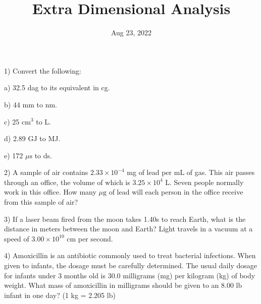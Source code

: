 \documentclass[12pt]{article}
\title{\textbf{Extra Dimensional Analysis}}
\date{Aug 23, 2022}
\newcommand{\brian}[1]{{\color{orange}{#1}}}
\begin{document}
\maketitle 

1) Convert the following:

a) 32.5 dag to its equivalent in cg.

\brian{325 cg}

b) 44 mm to nm.

\brian{$4.4\times 10^{7}$}

c) 25 cm$^3$ to L.

\brian{0.025 L}

d) 2.89 GJ to MJ.

\brian{2,890 MJ}

e) 172 $\mu\text{s}$ to ds.

\brian{0.00172 ds}

2) A sample of air contains $2.33 \times 10^{-4}$ mg of lead per mL of gas.
This air passes through an office, the volume of which is $3.25 \times 10^4$ L.
Seven people normally work in this office. How many $\mu\text{g}$ of lead will each
person in the office receive from this sample of air?

\brian{$1.08\times 10^6 \mu\text{g/person}$}

3) If a laser beam fired from the moon takes 1.40s to reach Earth, what is the
distance in meters between the moon and Earth? Light travels in a vacuum
at a speed of $3.00 \times 10^{10}$ cm per second.

\brian{$4.20\times 10^8$}

4) Amoxicillin is an antibiotic commonly used to treat bacterial infections.
When given to infants, the dosage must be carefully determined. The usual
daily dosage for infants under 3 months old is 30.0 milligrams (mg) per kilogram
(kg) of body weight. What mass of amoxicillin in milligrams should be given to
an 8.00 lb infant in one day? (1 kg = 2.205 lb)

\brian{109 mg}
\end{document}
